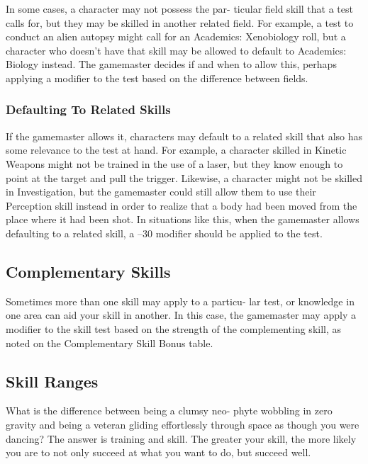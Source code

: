 In some cases, a character may not possess the par-
ticular field skill that a test calls for, but they may be 
skilled in another related field. For example, a test to 
conduct an alien autopsy might call for an Academics: 
Xenobiology roll, but a character who doesn't have 
that skill may be allowed to default to Academics: 
Biology instead. The gamemaster decides if and when 
to allow this, perhaps applying a modifier to the test 
based on the difference between fields.

\subsubsection{Defaulting To Related Skills}

If the gamemaster allows it, characters may default to 
a related skill that also has some relevance to the test 
at hand. For example, a character skilled in Kinetic 
Weapons might not be trained in the use of a laser, but 
they know enough to point at the target and pull the 
trigger. Likewise, a character might not be skilled in 
Investigation, but the gamemaster could still allow 
them to use their Perception skill instead in order to 
realize that a body had been moved from the place 
where it had been shot. In situations like this, when the 
gamemaster allows defaulting to a related skill, a –30 
modifier should be applied to the test.

\subsection{Complementary Skills}

Sometimes more than one skill may apply to a particu-
lar test, or knowledge in one area can aid your skill 
in another. In this case, the gamemaster may apply a 
modifier to the skill test based on the strength of the 
complementing skill, as noted on the Complementary 
Skill Bonus table.

\subsection{Skill Ranges}

What is the difference between being a clumsy neo-
phyte wobbling in zero gravity and being a veteran 
gliding effortlessly through space as though you were 
dancing? The answer is training and skill. The greater 
your skill, the more likely you are to not only succeed 
at what you want to do, but succeed well.

